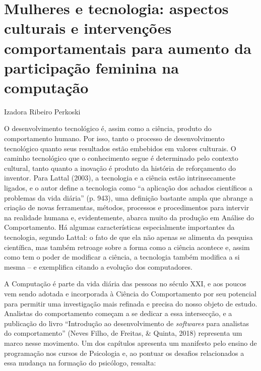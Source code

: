 \chapter{Mulheres e tecnologia: aspectos culturais e intervenções comportamentais para aumento da participação feminina na computação}
\begin{flushright}
\begin{scriptsize}
    Izadora Ribeiro Perkoski  
\end{scriptsize}
\vspace{1cm}
\end{flushright}

O desenvolvimento tecnológico é, assim como a ciência, produto do comportamento humano. Por isso, tanto o processo de desenvolvimento tecnológico quanto seus resultados estão embebidos em valores culturais. O caminho tecnológico que o conhecimento segue é determinado pelo contexto cultural, tanto quanto a inovação é produto da história de reforçamento do inventor. Para Lattal (2003), a tecnologia e a ciência estão intrinsecamente ligados, e o autor define a tecnologia como “a aplicação dos achados científicos a problemas da vida diária” (p. 943), uma definição bastante ampla que abrange a criação de novas ferramentas, métodos, processos e procedimentos para intervir na realidade humana e, evidentemente, abarca muito da produção em Análise do Comportamento. Há algumas características especialmente importantes da tecnologia, segundo Lattal: o fato de que ela não apenas se alimenta da pesquisa científica, mas também retroage sobre a forma como a ciência acontece e, assim como tem o poder de modificar a ciência, a tecnologia também modifica a si mesma – e exemplifica citando a evolução dos computadores.

A Computação é parte da vida diária das pessoas no século XXI, e aos poucos vem sendo adotada e incorporada à Ciência do Comportamento por seu potencial para permitir uma investigação mais refinada e precisa do nosso objeto de estudo. Analistas do comportamento começam a se dedicar a essa intersecção, e a publicação do livro “Introdução ao desenvolvimento de \textit{softwares} para analistas do comportamento” (Neves Filho, de Freitas, \& Quinta, 2018) representa um marco nesse movimento. Um dos capítulos apresenta um manifesto pelo ensino de programação nos cursos de Psicologia e, ao pontuar os desafios relacionados a essa mudança na formação do psicólogo, ressalta:

